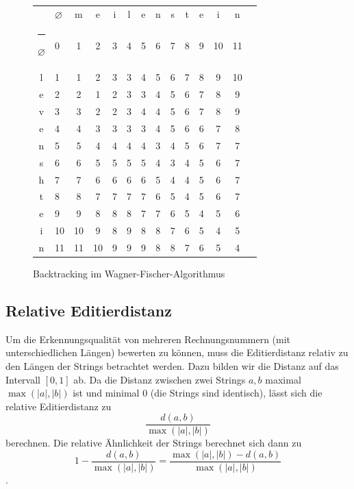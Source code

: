 \documentclass{whswinvcbook}
\makeatletter
\newcommand{\thickhline}{%
    \noalign {\ifnum 0=`}\fi \hrule height 1pt
    \futurelet \reserved@a \@xhline
}
\makeatother
\begin{document}
\begin{figure}[H]
    \begin{center}
        \begin{tabular}{|cTc|c|c|c|c|c|c|c|c|c|c|c|}
            \hline
            & $\varnothing$ & m & e & i & l & e & n & s & t & e & i & n\\\thickhline
            $\varnothing$ & 0 & 1 & 2 & 3 & 4 & 5 & 6 & 7 & 8 & 9 & 10 & 11\\\hline
            l & 1 & 1 & 2 & 3 & 3 & 4 & 5 & 6 & 7 & 8 & 9 & 10\\\hline
            e & 2 & 2 & 1 & 2 & 3 & 3 & 4 & 5 & 6 & 7 & 8 & 9\\\hline
            v & 3 & 3 & 2 & 2 & 3 & 4 & 4 & 5 & 6 & 7 & 8 & 9\\\hline
            e & 4 & 4 & 3 & 3 & 3 & 3 & 4 & 5 & 6 & 6 & 7 & 8\\\hline
            n & 5 & 5 & 4 & 4 & 4 & 4 & 3 & 4 & 5 & 6 & 7 & 7\\\hline
            s & 6 & 6 & 5 & 5 & 5 & 5 & 4 & 3 & 4 & 5 & 6 & 7\\\hline
            h & 7 & 7 & 6 & 6 & 6 & 6 & 5 & 4 & 4 & 5 & 6 & 7\\\hline
            t & 8 & 8 & 7 & 7 & 7 & 7 & 6 & 5 & 4 & 5 & 6 & 7\\\hline
            e & 9 & 9 & 8 & 8 & 8 & 7 & 7 & 6 & 5 & 4 & 5 & 6\\\hline
            i & 10 & 10 & 9 & 8 & 9 & 8 & 8 & 7 & 6 & 5 & 4 & 5\\\hline
            n & 11 & 11 & 10 & 9 & 9 & 9 & 8 & 8 & 7 & 6 & 5 & 4\\\hline
        \end{tabular}
    \end{center}
    \caption{Backtracking im Wagner-Fischer-Algorithmus}
    \label{fig-levenshtein-backtracking}
\end{figure}
\subsection{Relative Editierdistanz}
Um die Erkennungsqualität von mehreren Rechnungsnummern (mit unterschiedlichen Längen) bewerten zu können, muss die Editierdistanz relativ zu den Längen der Strings betrachtet werden. Dazu bilden wir die Distanz auf das Intervall $[0,1]$ ab. Da die Distanz zwischen zwei Strings $a,b$ maximal $\max(|a|,|b|)$ ist und minimal $0$ (die Strings sind identisch), lässt sich die relative Editierdistanz zu $$\frac{d(a,b)}{\max(|a|,|b|)}$$ berechnen. Die relative Ähnlichkeit der Strings berechnet sich dann zu $$1-\frac{d(a,b)}{\max(|a|,|b|)}=\frac{\max(|a|,|b|)-d(a,b)}{\max(|a|,|b|)}$$.
\end{document}
